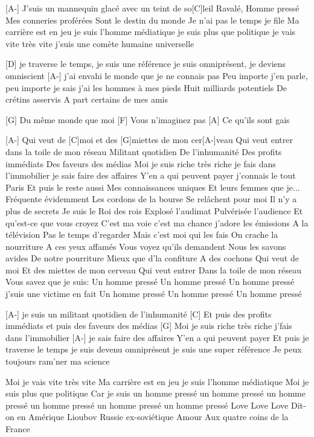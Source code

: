 [A-]
J'suis un mannequin glacé avec un teint de so[C]leil
Ravalé, Homme pressé Mes conneries proférées
Sont le destin du monde Je n'ai pas le temps je file
Ma carrière est en jeu je suis l'homme médiatique
je suis plus que politique je vais vite très vite
j'suis une comète humaine universelle

[D]
je traverse le temps, je suis une référence
je suis omniprésent, je deviens omniscient
[A-]
j'ai envahi le monde que je ne connais pas
Peu importe j'en parle, peu importe je sais
j'ai les hommes à  mes pieds Huit milliards potentiels
De crétins asservis A part certains de mes amis

[G]
Du même monde que moi
[F]
Vous n'imaginez pas
[A]
Ce qu'ils sont gais

[A-]
Qui veut de [C]moi et des [G]miettes de mon cer[A-]veau
Qui veut entrer
dans la toile de mon réseau
Militant quotidien
De l'inhumanité
Des profits immédiats
Des faveurs des médias
Moi je suis riche très riche
je fais dans l'immobilier
je sais faire des affaires
Y'en a qui peuvent payer
j'connais le tout Paris
Et puis le reste aussi
Mes connaissances uniques
Et leurs femmes que je...
Fréquente évidemment
Les cordons de la bourse
Se relâchent pour moi
Il n'y a plus de secrets
Je suis le Roi des rois
Explosé l'audimat
Pulvérisée l'audience
Et qu'est-ce que vous croyez
C'est ma voie c'est ma chance
j'adore les émissions
A la télévision
Pas le temps d'regarder
Mais c'est moi qui les fais
On crache la nourriture
A ces yeux affamés
Vous voyez qu'ils demandent
Nous les savons avides
De notre pourriture
Mieux que d'la confiture
A des cochons
Qui veut de moi
Et des miettes de mon cerveau
Qui veut entrer
Dans la toile de mon réseau
Vous savez que je suis:
Un homme pressé
Un homme pressé
Un homme pressé
j'suis une victime en fait
Un homme pressé
Un homme pressé
Un homme pressé

[A-]
je suis un militant quotidien de l'inhumanité
[C] Et puis des profits immédiats et puis des faveurs des médias
[G] Moi je suis riche très riche j'fais dans l'immobilier
[A-]
je sais faire des affaires
Y'en a qui peuvent payer
Et puis je traverse le temps
je suis devenu omniprésent
je suis une super référence
Je peux toujours ram'ner ma science

Moi je vais vite très vite
Ma carrière est en jeu
je suis l'homme médiatique
Moi je suis plus que politique
Car je suis un homme pressé
un homme pressé
un homme pressé
un homme pressé
un homme pressé
un homme pressé
Love Love Love
Dit-on en Amérique
Lioubov
Russie ex-soviétique
Amour
Aux quatre coins de la France
